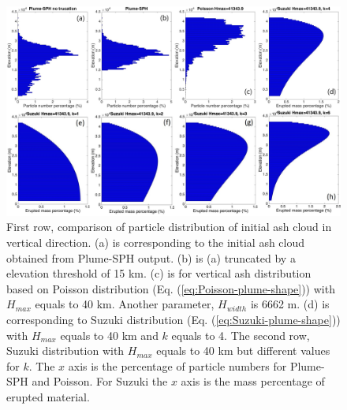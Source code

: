 \documentclass[utf8]{frontiersSCNS} %
\begin{document}
\begin{figure}[!htb]
\centering
\includegraphics[width=1.0\textwidth]{Figures/particle_distribution_vertical_compare}
\caption{First row, comparison of particle distribution of initial ash cloud in vertical direction. (a) is corresponding to the initial ash cloud obtained from Plume-SPH output. (b) is (a) truncated by a elevation threshold of 15 km. (c) is for vertical ash distribution based on Poisson distribution (Eq. (\ref{eq:Poisson-plume-shape})) with $H_{max}$ equals to 40 km. Another parameter, $H_{width}$ is 6662 m. (d) is corresponding to Suzuki distribution (Eq. (\ref{eq:Suzuki-plume-shape})) with $H_{max}$ equals to 40 km and $k$ equals to 4\citep{pfeiffer2005model}. The second row, Suzuki distribution with $H_{max}$ equals to 40 km but different values for $k$. The $x$ axis is the percentage of particle numbers for Plume-SPH and Poisson. For Suzuki the $x$ axis is the mass percentage of erupted material.}
\label{fig:Particle-distribution-Plume-SPH-vs-semiempirical}
\end{figure}
\end{document}

